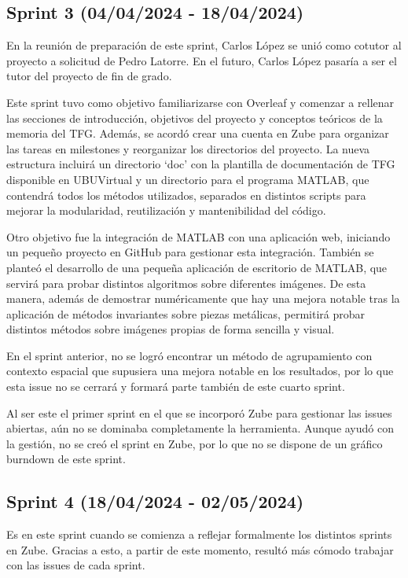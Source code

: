 \subsection{Sprint 3 (04/04/2024 - 18/04/2024)}\label{sprint-3}

En la reunión de preparación de este sprint, Carlos López se unió como cotutor al proyecto a solicitud de Pedro Latorre. En el futuro, Carlos López pasaría a ser el tutor del proyecto de fin de grado.

Este sprint tuvo como objetivo familiarizarse con Overleaf y comenzar a rellenar las secciones de introducción, objetivos del proyecto y conceptos teóricos de la memoria del TFG. Además, se acordó crear una cuenta en Zube para organizar las tareas en milestones y reorganizar los directorios del proyecto. La nueva estructura incluirá un directorio `doc' con la plantilla de documentación de TFG disponible en UBUVirtual y un directorio para el programa MATLAB, que contendrá todos los métodos utilizados, separados en distintos scripts para mejorar la modularidad, reutilización y mantenibilidad del código.

Otro objetivo fue la integración de MATLAB con una aplicación web, iniciando un pequeño proyecto en GitHub para gestionar esta integración. También se planteó el desarrollo de una pequeña aplicación de escritorio de MATLAB, que servirá para probar distintos algoritmos sobre diferentes imágenes. De esta manera, además de demostrar numéricamente que hay una mejora notable tras la aplicación de métodos invariantes sobre piezas metálicas, permitirá probar distintos métodos sobre imágenes propias de forma sencilla y visual.

En el sprint anterior, no se logró encontrar un método de agrupamiento con contexto espacial que supusiera una mejora notable en los resultados, por lo que esta issue no se cerrará y formará parte también de este cuarto sprint.

Al ser este el primer sprint en el que se incorporó Zube para gestionar las issues abiertas, aún no se dominaba completamente la herramienta. Aunque ayudó con la gestión, no se creó el sprint en Zube, por lo que no se dispone de un gráfico burndown de este sprint.

\subsection{Sprint 4 (18/04/2024 - 02/05/2024)}\label{sprint-4}

Es en este sprint cuando se comienza a reflejar formalmente los distintos sprints en Zube. Gracias a esto, a partir de este momento, resultó más cómodo trabajar con las issues de cada sprint.

